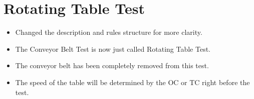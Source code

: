 \section{Rotating Table Test}
\begin{itemize}
  \item Changed the description and rules structure for more clarity.
  \item The Conveyor Belt Test is now just called Rotating Table Test.
  \item The conveyor belt has been completely removed from this test.
  \item The speed of the table will be determined by the OC or TC right before the test.
\end{itemize}
